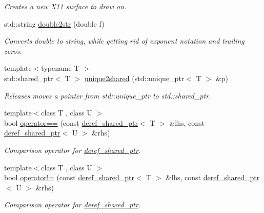 \begin{DoxyCompactItemize}
\begin{DoxyCompactList}\small\item\em Creates a new X11 surface to draw on. \end{DoxyCompactList}\item 
std\+::string \hyperlink{namespaceslb_1_1core_1_1util_a903619e2dfde6392a7384dbfeaa6eafc}{double2str} (double f)
\begin{DoxyCompactList}\small\item\em Converts double to string, while getting rid of exponent notation and trailing zeros. \end{DoxyCompactList}\item 
{\footnotesize template$<$typename T $>$ }\\std\+::shared\+\_\+ptr$<$ T $>$ \hyperlink{namespaceslb_1_1core_1_1util_ab3e706fd0a5bcfdbcdac11c8e6ee5f31}{unique2shared} (std\+::unique\+\_\+ptr$<$ T $>$ \&p)
\begin{DoxyCompactList}\small\item\em Releases moves a pointer from {\ttfamily std\+::unique\+\_\+ptr} to {\ttfamily std\+::shared\+\_\+ptr}. \end{DoxyCompactList}\item 
{\footnotesize template$<$class T , class U $>$ }\\bool \hyperlink{namespaceslb_1_1core_1_1util_a6524ef64141336dce5cec7062b756569}{operator==} (const \hyperlink{classslb_1_1core_1_1util_1_1deref__shared__ptr}{deref\+\_\+shared\+\_\+ptr}$<$ T $>$ \&lhs, const \hyperlink{classslb_1_1core_1_1util_1_1deref__shared__ptr}{deref\+\_\+shared\+\_\+ptr}$<$ U $>$ \&rhs)
\begin{DoxyCompactList}\small\item\em Comparison operator for \hyperlink{classslb_1_1core_1_1util_1_1deref__shared__ptr}{deref\+\_\+shared\+\_\+ptr}. \end{DoxyCompactList}\item 
{\footnotesize template$<$class T , class U $>$ }\\bool \hyperlink{namespaceslb_1_1core_1_1util_a6a344fb210c4db8ba8a67de43ed8ea35}{operator!=} (const \hyperlink{classslb_1_1core_1_1util_1_1deref__shared__ptr}{deref\+\_\+shared\+\_\+ptr}$<$ T $>$ \&lhs, const \hyperlink{classslb_1_1core_1_1util_1_1deref__shared__ptr}{deref\+\_\+shared\+\_\+ptr}$<$ U $>$ \&rhs)
\begin{DoxyCompactList}\small\item\em Comparison operator for \hyperlink{classslb_1_1core_1_1util_1_1deref__shared__ptr}{deref\+\_\+shared\+\_\+ptr}. \end{DoxyCompactList}\item 

\end{DoxyCompactItemize}
